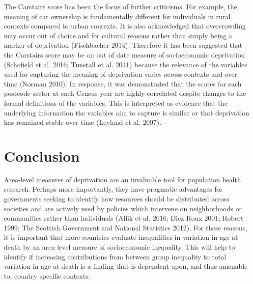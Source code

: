 \documentclass[12pt,oneside,a4paper]{article} %
\theoremstyle{definition}
\begin{document}
The Carstairs score has been the focus of further criticisms. For example, the meaning of car ownership is fundamentally different for individuals in rural contexts compared to urban contexts. It is also acknowledged that overcrowding may occur out of choice and for cultural reasons rather than simply being a marker of deprivation (Fischbacher 2014). Therefore it has been suggested that the Carstairs score may be an out of date measure of socioeconomic deprivation (Schofield et al. 2016; Tunstall et al. 2011) because the relevance of the variables used for capturing the meaning of deprivation varies across contexts and over time (Norman 2010). In response, it was demonstrated that the scores for each postcode sector at each Census year are highly correlated despite changes to the formal definitions of the variables. This is interpreted as evidence that the underlying information the variables aim to capture is similar or that deprivation has remained stable over time (Leyland et al. 2007).

\section{Conclusion}
Area-level measures of deprivation are an invaluable tool for population health research. Perhaps more importantly, they have pragmatic advantages for governments seeking to identify how resources should be distributed across societies and are actively used by policies which intervene on neighborhoods or communities rather than individuals (Allik et al. 2016; Diez Roux 2001; Robert 1999; The Scottish Government and National Statistics 2012). For these reasons, it is important that more countries evaluate inequalities in variation in age at death by an area-level measure of socioeconomic inequality. This will help to identify if increasing contributions from between group inequality to total variation in age at death is a finding that is dependent upon, and thus amenable to, country specific contexts.  




\end{document}
